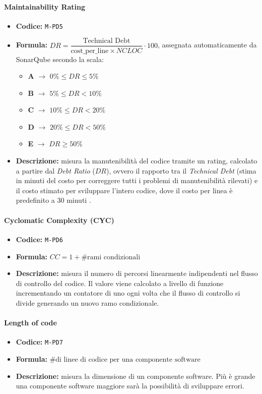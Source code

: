 \documentclass[a4paper,12pt]{article}
\begin{document}
\paragraph{Maintainability Rating}
\begin{itemize}
\item \textbf{Codice:} \texttt{M-PD5}
\item \textbf{Formula:} $DR = \dfrac{\text{Technical Debt}}{\text{cost\_per\_line} 
\times NCLOC} \cdot 100$, assegnata automaticamente da SonarQube secondo la scala:
\begin{itemize}
    \item \textbf{A} $\rightarrow$ $0\% \leq DR \leq 5\%$
    \item \textbf{B} $\rightarrow$ $5\% \leq DR < 10\%$
    \item \textbf{C} $\rightarrow$ $10\% \leq DR < 20\%$
    \item \textbf{D} $\rightarrow$ $20\% \leq DR < 50\%$
    \item \textbf{E} $\rightarrow$ $DR \geq 50\%$
\end{itemize}
\item \textbf{Descrizione:} misura la manutenibilità del codice tramite un rating, calcolato a partire dal 
\textit{Debt Ratio} ($DR$), ovvero il rapporto tra il \textit{Technical Debt} 
(stima in minuti del costo per correggere tutti i problemi di manutenibilità 
rilevati) e il costo stimato per sviluppare l'intero codice, dove il costo per 
linea è predefinito a 30 minuti \cite{sonarqube-metrics}.
\end{itemize}

\paragraph{Cyclomatic Complexity (CYC)}
\begin{itemize}
    \item \textbf{Codice:} \texttt{M-PD6}
    \item \textbf{Formula:} $CC = 1 + \# \text{rami condizionali}$
    \item \textbf{Descrizione:} misura il numero di percorsi linearmente indipendenti 
nel flusso di controllo del codice. Il valore viene calcolato a livello di funzione 
incrementando un contatore di uno ogni volta che il flusso di controllo si divide 
generando un nuovo ramo condizionale.
\end{itemize}

\paragraph{Length of code}
\begin{itemize}
    \item \textbf{Codice:} \texttt{M-PD7}
    \item \textbf{Formula:} $\text{\# di linee di codice per una componente software}$
    \item \textbf{Descrizione:} misura la dimensione di un componente software. Più è grande una componente software maggiore sarà la possibilità di sviluppare errori.
\end{itemize}
\end{document}
